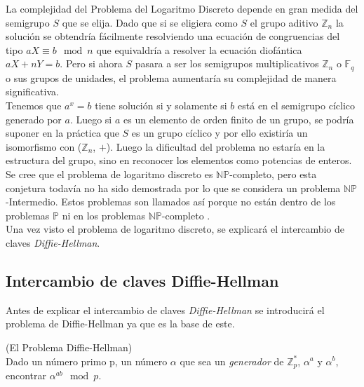 La complejidad del Problema del Logaritmo Discreto depende en gran medida del semigrupo $S$ que se elija.
Dado que si se eligiera como $S$ el grupo aditivo $\mathbb{Z}_n$ la solución se obtendría fácilmente resolviendo una ecuación de congruencias del tipo $aX \equiv b \mod n$ que equivaldría a resolver la ecuación diofántica $aX + nY = b$. Pero si ahora $S$ pasara a ser los semigrupos multiplicativos $\mathbb{Z}_n$ o $\mathbb{F}_q$ o sus grupos de unidades, el problema aumentaría su complejidad de manera significativa.\\
Tenemos que $a^x = b$ tiene solución si y solamente si $b$ está en el semigrupo cíclico generado por $a$. Luego si $a$ es un elemento de orden finito de un grupo, se podría suponer en la práctica que $S$ es un grupo cíclico y por ello existiría un isomorfismo con ($\mathbb{Z}_n$, $+$). Luego la dificultad del problema no estaría en la estructura del grupo, sino en reconocer los elementos como potencias de enteros.\\
Se cree que el problema de logaritmo discreto es $\mathbb{NP}$-completo, pero esta conjetura todavía no ha sido demostrada por lo que se considera un problema $\mathbb{NP}$-Intermedio. Estos problemas son llamados así porque no están dentro de los problemas $\mathbb{P}$ ni en los problemas $\mathbb{NP}$-completo \cite{NP-intermedio}.\\
Una vez visto el problema de logaritmo discreto, se explicará el intercambio de claves \emph{Diffie-Hellman}.
\subsection{Intercambio de claves Diffie-Hellman}
Antes de explicar el intercambio de claves \emph{Diffie-Hellman} se introducirá el problema de Diffie-Hellman ya que es la base de este.\\


\begin{definicion}
	(El Problema Diffie-Hellman)\\ Dado un número primo p, un número $\alpha$ que sea un \emph{generador} de $\mathbb{Z}^*_{p}$, $\alpha^a$ y $\alpha^b$, encontrar $\alpha^{ab} \mod p$.  
\end{definicion}

